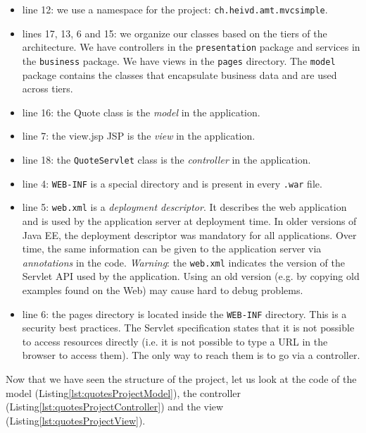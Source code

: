 \begin{itemize}
\item line 12: we use a namespace for the project: \texttt{ch.heivd.amt.mvcsimple}.
\item lines 17, 13, 6 and 15: we organize our classes based on the tiers of the architecture. We have controllers in the \texttt{presentation} package and services in the \texttt{business} package. We have views in the \texttt{pages} directory. The \texttt{model} package contains the classes that encapsulate business data and are used across tiers.
\item line 16: the Quote class is the \emph{model} in the application.
\item line 7: the view.jsp \ac{JSP} is the \emph{view} in the application.
\item line 18: the \texttt{QuoteServlet} class is the \emph{controller} in the application.
\item line 4: \texttt{WEB-INF} is a special directory and is present in every \texttt{.war} file.
\item line 5: \texttt{web.xml} is a \emph{deployment descriptor}. It describes the web application and is used by the application server at deployment time. In older versions of Java EE, the deployment descriptor was mandatory for all applications. Over time, the same information can be given to the application server via \emph{annotations} in the code. \emph{Warning}: the \texttt{web.xml} indicates the version of the Servlet API used by the application. Using an old version (e.g. by copying old examples found on the Web) may cause hard to debug problems.
\item line 6: the pages directory is located inside the \texttt{WEB-INF} directory. This is a security best practices. The Servlet specification states that it is not possible to access resources directly (i.e. it is not possible to type a URL in the browser to access them). The only way to reach them is to go via a controller. 
\end{itemize}

Now that we have seen the structure of the project, let us look at the code of the model (Listing\ref{lst:quotesProjectModel}), the controller (Listing\ref{lst:quotesProjectController}) and the view (Listing\ref{lst:quotesProjectView}).

